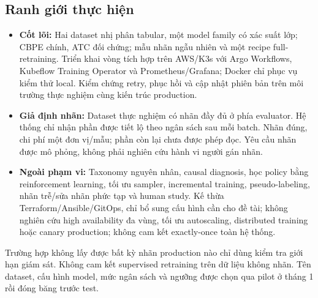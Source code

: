 \subsection{Ranh giới thực hiện}
\begin{itemize}
  \item \textbf{Cốt lõi:} Hai dataset nhị phân tabular, một model family có xác suất lớp; CBPE chính, ATC đối chứng; mẫu nhãn ngẫu nhiên và một recipe full-retraining. Triển khai vòng tích hợp trên AWS/K3s với Argo Workflows, Kubeflow Training Operator và Prometheus/Grafana; Docker chỉ phục vụ kiểm thử local. Kiểm chứng retry, phục hồi và cập nhật phiên bản trên môi trường thực nghiệm cùng kiến trúc production.
  \item \textbf{Giả định nhãn:} Dataset thực nghiệm có nhãn đầy đủ ở phía evaluator. Hệ thống chỉ nhận phần được tiết lộ theo ngân sách sau mỗi batch. Nhãn đúng, chi phí một đơn vị/mẫu; phần còn lại chưa được phép đọc. Yêu cầu nhãn được mô phỏng, không phải nghiên cứu hành vi người gán nhãn.
  \item \textbf{Ngoài phạm vi:} Taxonomy nguyên nhân, causal diagnosis, học policy bằng reinforcement learning, tối ưu sampler, incremental training, pseudo-labeling, nhãn trễ/sửa nhãn phức tạp và human study. Kế thừa Terraform/Ansible/GitOps, chỉ bổ sung cấu hình cần cho đề tài; không nghiên cứu high availability đa vùng, tối ưu autoscaling, distributed training hoặc canary production; không cam kết exactly-once toàn hệ thống.
\end{itemize}
Trường hợp không lấy được bất kỳ nhãn production nào chỉ dùng kiểm tra giới hạn giám sát. Không cam kết supervised retraining trên dữ liệu không nhãn. Tên dataset, cấu hình model, mức ngân sách và ngưỡng được chọn qua pilot ở tháng 1 rồi đóng băng trước test.
